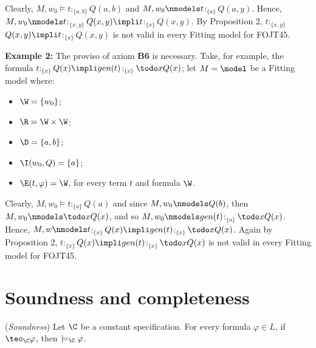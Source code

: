 \qquad Clearly, $M,w_0 \models t$$:_{\{a,b\}}$$Q(a,b)$ and $M,w_0 \nmodels t$$:_{\{a\}}$$Q(a,y)$. Hence, $M,w_0 \nmodels t$$:_{\{x,y\}}$$Q(x,y) \impli t$$:_{\{x\}}$$Q(x,y)$. By Proposition 2, $t$$:_{\{x,y\}}$$Q(x,y) \impli t$$:_{\{x\}}$$Q(x,y)$ is not valid in every Fitting model for FOJT45.


\qquad \textbf{Example 2:} The proviso of axiom \textbf{B6} is necessary. Take, for example, the formula $t$$:_{\{x\}}$$Q(x) \impli gen(t)$$:_{\{x\}}$$\todo x Q(x)$; let $M =\model$ be a Fitting model where:
\begin{itemize}
\item $\W = \{w_0\}$;
\item $\R = \W \times \W$;
\item $\D = \{a,b\}$;
\item $\I(w_{0},Q) =  \{a\}$;
\item $\E(t,\varphi) = \W$, for every term $t$ and formula $\W$.
\end{itemize}


\qquad Clearly, $M,w_0 \models t$$:_{\{a\}}$$Q(a)$ and since $M,w_0 \nmodels Q(b)$, then $M,w_0 \nmodels \todo x Q(x)$, and so $M,w_0 \nmodels gen(t)$$:_{\{a\}}$$\todo x Q(x)$. Hence, $M,w \nmodels t$$:_{\{x\}}$$Q(x) \impli gen(t)$$:_{\{x\}}$$\todo x Q(x)$. Again by Proposition 2, $t$$:_{\{x\}}$$Q(x) \impli gen(t)$$:_{\{x\}}$$\todo x Q(x)$ is not valid in every Fitting model for FOJT45.















\section{Soundness and completeness}
	
\begin{teor}
(\textit{Soundness}) Let $\C$ be a constant specification. For every formula $\varphi \in L$, if $\teo_{\C} \varphi$, then $\models_{\C}\varphi$.
\end{teor}	
	
